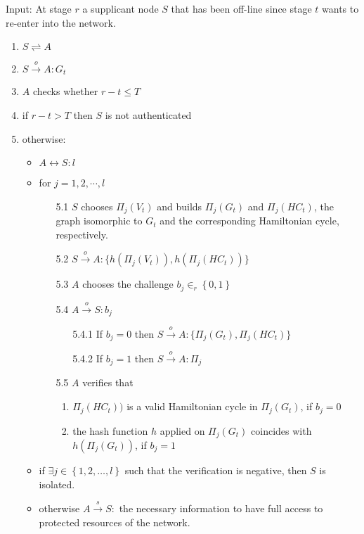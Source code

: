 \documentclass{article}
\begin{document}
Input: At stage $r$ a supplicant node $S$ that has been off-line
since stage $t$ wants to re-enter into the network.
\begin{enumerate}
    \item $S\rightleftharpoons A$
    \item  $S \stackrel{o}{\rightarrow} A: G_t$
    \item $A$ checks whether $r - t \leq T$
    \item  if $r - t > T$ then $S$ is not authenticated
    \item  otherwise:
    \begin{itemize}
        \item $A \leftrightarrow S: l $
        \item for $ j = 1,2,\cdots,l$
        \begin{enumerate}
             \item [5.1] $S$  chooses ${\Pi}_j(V_t)$ and builds  ${\Pi}_j(G_t)$ and ${\Pi}_j(HC_t)$, the graph
             isomorphic to $G_t$ and the corresponding Hamiltonian cycle, respectively.
             \item [5.2] $S \stackrel{o}{\rightarrow} A: \{ h({\Pi}_j(V_t)), h({\Pi}_j(HC_t)) \}$
             \item [5.3] $A$ chooses  the challenge $b_j \in_r \left\{0,1\right \} $
             \item [5.4] $A \stackrel{o}{\rightarrow} S: b_j$
             \begin{enumerate}
                    \item [5.4.1] If $b_j=0$ then $S \stackrel{o}{\rightarrow} A: \{ {\Pi}_j(G_t), {\Pi}_j(HC_t) \} $
                    \item [5.4.2] If $b_j=1$ then $S \stackrel{o}{\rightarrow} A: {\Pi}_j$
             \end{enumerate}
             \item [5.5] $A$ verifies that
             \begin{enumerate}
                \item ${\Pi}_j(HC_t))$ is a valid Hamiltonian cycle in ${\Pi}_j(G_t)$, if $b_j=0$
                \item the hash function $h$ applied on ${\Pi}_j(G_t)$ coincides with $h({\Pi}_j(G_t))$, if $b_j=1$
             \end{enumerate}
        \end{enumerate}
        \item if $\exists  j \in \left\{1,2,\ldots,l\right\}$ such that the verification is negative, then $S$ is 							isolated.
        \item otherwise $A \stackrel{s}{\rightarrow} S:$ the necessary information to have full access
            to protected resources of the network.
    \end{itemize}   
\end{enumerate}   
  
\end{document}
